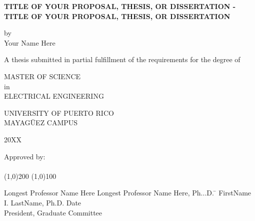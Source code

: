 



\thispagestyle{empty}
\begin{center}
	\begin{singlespace}
		\textbf{TITLE OF YOUR PROPOSAL, THESIS, OR DISSERTATION - TITLE OF YOUR PROPOSAL, THESIS, OR DISSERTATION}
	\end{singlespace}
	\vspace{4 mm}
	by
	\\
	\vspace{4 mm}
	Your Name Here %
	\vspace{4 mm}
	\begin{singlespace}
		A thesis submitted in partial fulfillment of the requirements for the degree of %
	\end{singlespace}
	\vspace{4 mm}
	MASTER OF SCIENCE %
	\\
	in
	\\
	ELECTRICAL ENGINEERING %
	\\
	\vspace{4 mm}
	\begin{singlespace}

		UNIVERSITY OF PUERTO RICO
		\\
		MAYAG\"UEZ CAMPUS
	\end{singlespace}

	20XX %
\end{center}
\bigskip
\bigskip
\bigskip
\bigskip
\bigskip
\bigskip




\noindent Approved by:
\\
\\
\line(1,0){200} \hspace{40 mm} \line(1,0){100}\\
\noindent
\vspace{-1.75\baselineskip}
\begin{tabbing}
	Longest Professor Name Here Longest Professor Name Here, Ph...D. \=  \kill
	FirstName I. LastName, Ph.D. \>  Date\\President, Graduate Committee  %
\end{tabbing}



